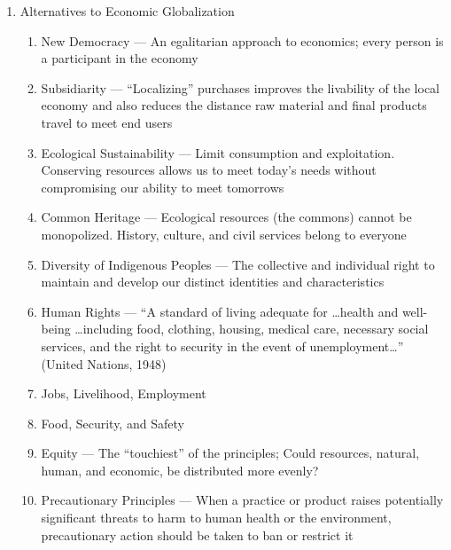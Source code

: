 \documentclass[12pt]{article}
\begin{document}
\begin{enumerate}
\begin{enumerate}
        \end{enumerate}

      \item Alternatives to Economic Globalization

        \begin{enumerate}

          \item New Democracy — An egalitarian approach to economics; every person is a participant in the economy

          \item Subsidiarity — “Localizing” purchases improves the livability of the local economy and also reduces the distance raw material and final products travel to meet end users

          \item Ecological Sustainability — Limit consumption and exploitation.  Conserving resources allows us to meet today’s needs without compromising our ability to meet tomorrows

          \item Common Heritage — Ecological resources (the commons) cannot be monopolized.  History, culture, and civil services belong to everyone

          \item Diversity of Indigenous Peoples — The collective and individual right to maintain and develop our distinct identities and characteristics

          \item Human Rights — “A standard of living adequate for \dots health and well-being \dots including food, clothing, housing, medical care, necessary social services, and the right to security in the event of unemployment\dots” (United Nations, 1948)

          \item Jobs, Livelihood, Employment

          \item Food, Security, and Safety

          \item Equity — The “touchiest” of the principles; Could resources, natural, human, and economic, be distributed more evenly?

          \item Precautionary Principles — When a practice or product raises potentially significant threats to harm to human health or the environment, precautionary action should be taken to ban or restrict it

        \end{enumerate}

    \end{enumerate}
\end{document}
